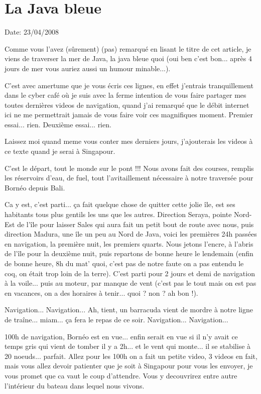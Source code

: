 \section{La Java bleue}

Date: 23/04/2008

\begin{multicols}{2}

Comme vous l'avez (sûrement) (pas) remarqué en lisant le titre de cet article, je viens de traverser la mer de Java, la java bleue quoi (oui ben c'est bon... après 4 jours de mer vous auriez aussi un humour minable...).

C'est avec amertume que je vous écris ces lignes, en effet j'entrais tranquillement dans le cyber café où je suis avec la ferme intention de vous faire partager mes toutes dernières videos de navigation, quand j'ai remarqué que le débit internet ici ne me permettrait jamais de vous faire voir ces magnifiques moment. Premier essai... rien. Deuxième essai... rien.

Laissez moi quand meme vous conter mes derniers jours, j'ajouterais les videos à ce texte quand je serai à Singapour.

C'est le départ, tout le monde sur le pont !!! Nous avons fait des courses, remplis les réservoirs d'eau, de fuel, tout l'avitaillement nécessaire à notre traversée pour Bornéo depuis Bali.

Ca y est, c'est parti... ça fait quelque chose de quitter cette jolie île, est ses habitants tous plus gentils les uns que les autres. Direction Seraya, pointe Nord-Est de l'île pour laisser Sales qui aura fait un petit bout de route avec nous, puis direction Madura, une île un peu au Nord de Java, voici les premières 24h passées en navigation, la première nuit, les premiers quarts. Nous jetons l'encre, à l'abris de l'île pour la deuxième nuit, puis repartons de bonne heure le lendemain (enfin de bonne heure, 8h du mat' quoi, c'est pas de notre faute on a pas entendu le coq, on était trop loin de la terre). C'est parti pour 2 jours et demi de navigation à la voile... puis au moteur, par manque de vent (c'est pas le tout mais on est pas en vacances, on a des horaires à tenir... quoi ? non ? ah bon !).

Navigation... Navigation... Ah, tient, un barracuda vient de mordre à notre ligne de traîne... miam... ça fera le repas de ce soir. Navigation... Navigation...

100h de navigation, Bornéo est en vue... enfin serait en vue si il n'y avait ce temps gris qui vient de tomber il y a 2h... et le vent qui monte... il se stabilise à 20 noeuds... parfait. Allez pour les 100h on a fait un petite video, 3 videos en fait, mais vous allez devoir patienter que je soit à Singapour pour vous les envoyer, je vous promet que ca vaut le coup d'attendre. Vous y decouvrirez entre autre l'intérieur du bateau dans lequel nous vivons.


\end{multicols}
